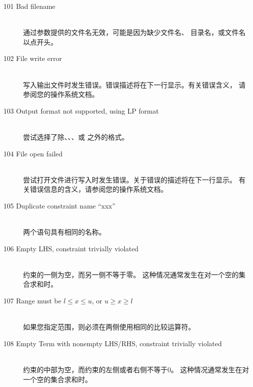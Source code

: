 \begin{description}
%
%
\item[101 Bad filename]\ \\
  通过参数提供的文件名无效，可能是因为缺少文件名、
  目录名，或文件名以点开头。
\item[102 File write error]\ \\
  写入输出文件时发生错误。错误描述将在下一行显示。有关错误含义，
  请参阅您的操作系统文档。
\item[103 Output format not supported, using LP format]\ \\
  尝试选择了除、、、或
  之外的格式。
\item[104 File open failed]\ \\
  尝试打开文件进行写入时发生错误。关于错误的描述将在下一行显示。
  有关错误信息的含义，请参阅您的操作系统文档。
%
%
\item[105 Duplicate constraint name ``xxx'']\ \\
  两个语句具有相同的名称。
\item[106 Empty LHS, constraint trivially violated]\ \\
  约束的一侧为空，而另一侧不等于零。
  这种情况通常发生在对一个空的集合求和时。
\item[107 Range must be $l\leq x\leq u$, or $u \geq x\geq l$]\ \\
  如果您指定范围，则必须在两侧使用相同的比较运算符。
\item[108 Empty Term with nonempty LHS/RHS, constraint trivially violated]\ \\
  约束的中部为空，而约束的左侧或者右侧不等于0。
  这种情况通常发生在对一个空的集合求和时。

\end{description}

